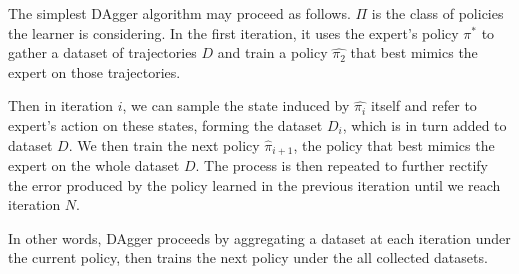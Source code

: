 \documentclass[twoside]{article}
\begin{document}
The simplest DAgger algorithm may proceed as follows.
$\Pi$ is the class of policies the learner is considering.
In the first iteration, it uses the expert’s policy $\pi^*$ to gather
a dataset of trajectories $D$ and train a policy $\hat{\pi_2}$ that best mimics the expert on those trajectories. 

Then in iteration $i$, we can sample the state induced by $\hat{\pi_i}$ itself and refer to expert's action on these states, forming the dataset $D_i$, which is in turn added to dataset $D$. We then train the next policy $\hat{\pi}_{i+1}$, the policy that best mimics the expert on the whole dataset $D$. The process is then repeated to further rectify the error produced by the policy learned in the previous iteration until we reach iteration $N$.

In other words, DAgger proceeds by aggregating a dataset at each iteration under the current policy, then trains the next policy under the all collected datasets. 








\end{document}
